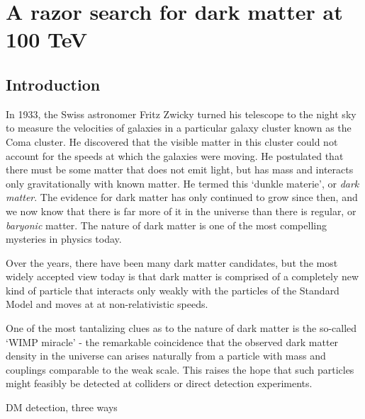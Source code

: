 \chapter{A razor search for dark matter at 100 TeV}\label{ch:DM_100_TeV}

\section{Introduction}
In 1933, the Swiss astronomer Fritz Zwicky turned his telescope to the night sky to measure the velocities of galaxies in a particular galaxy cluster known as the Coma cluster. He discovered that the visible matter in this cluster could not account for the speeds at which the galaxies were moving. He postulated that there must be some matter that does not emit light, but has mass and interacts only gravitationally with known matter. He termed this `dunkle materie', or \emph{dark matter}. The evidence for dark matter has only continued to grow since then, and we now know that there is far more of it in the universe than there is regular, or \emph{baryonic} matter. The nature of dark matter is one of the most compelling mysteries in physics today.

Over the years, there have been many dark matter candidates, but the most widely accepted view today is that dark matter is comprised of a completely new kind of particle that interacts only weakly with the particles of the Standard Model and moves at at non-relativistic speeds.

One of the most tantalizing clues as to the nature of dark matter is the so-called `WIMP miracle' - the remarkable coincidence that the observed dark matter density in the universe can arises naturally from a particle with mass and couplings comparable to the weak scale. This raises the hope that such particles might feasibly be detected at colliders or direct detection experiments.
\begin{marginfigure}
  \centering
  \caption{DM detection, three ways}
  \label{fig:dm_annihilation}
\end{marginfigure}


